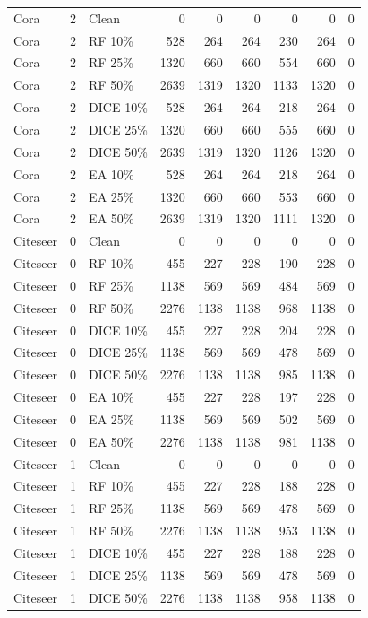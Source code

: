 {\begin{longtable}{lr l rrrrrr}
Cora & 2 & Clean & 0 & 0 & 0 & 0 & 0 & 0 \\
Cora & 2 & RF 10\% & 528 & 264 & 264 & 230 & 264 & 0 \\
Cora & 2 & RF 25\% & 1320 & 660 & 660 & 554 & 660 & 0 \\
Cora & 2 & RF 50\% & 2639 & 1319 & 1320 & 1133 & 1320 & 0 \\
Cora & 2 & DICE 10\% & 528 & 264 & 264 & 218 & 264 & 0 \\
Cora & 2 & DICE 25\% & 1320 & 660 & 660 & 555 & 660 & 0 \\
Cora & 2 & DICE 50\% & 2639 & 1319 & 1320 & 1126 & 1320 & 0 \\
Cora & 2 & EA 10\% & 528 & 264 & 264 & 218 & 264 & 0 \\
Cora & 2 & EA 25\% & 1320 & 660 & 660 & 553 & 660 & 0 \\
Cora & 2 & EA 50\% & 2639 & 1319 & 1320 & 1111 & 1320 & 0 \\
Citeseer & 0 & Clean & 0 & 0 & 0 & 0 & 0 & 0 \\
Citeseer & 0 & RF 10\% & 455 & 227 & 228 & 190 & 228 & 0 \\
Citeseer & 0 & RF 25\% & 1138 & 569 & 569 & 484 & 569 & 0 \\
Citeseer & 0 & RF 50\% & 2276 & 1138 & 1138 & 968 & 1138 & 0 \\
Citeseer & 0 & DICE 10\% & 455 & 227 & 228 & 204 & 228 & 0 \\
Citeseer & 0 & DICE 25\% & 1138 & 569 & 569 & 478 & 569 & 0 \\
Citeseer & 0 & DICE 50\% & 2276 & 1138 & 1138 & 985 & 1138 & 0 \\
Citeseer & 0 & EA 10\% & 455 & 227 & 228 & 197 & 228 & 0 \\
Citeseer & 0 & EA 25\% & 1138 & 569 & 569 & 502 & 569 & 0 \\
Citeseer & 0 & EA 50\% & 2276 & 1138 & 1138 & 981 & 1138 & 0 \\
Citeseer & 1 & Clean & 0 & 0 & 0 & 0 & 0 & 0 \\
Citeseer & 1 & RF 10\% & 455 & 227 & 228 & 188 & 228 & 0 \\
Citeseer & 1 & RF 25\% & 1138 & 569 & 569 & 478 & 569 & 0 \\
Citeseer & 1 & RF 50\% & 2276 & 1138 & 1138 & 953 & 1138 & 0 \\
Citeseer & 1 & DICE 10\% & 455 & 227 & 228 & 188 & 228 & 0 \\
Citeseer & 1 & DICE 25\% & 1138 & 569 & 569 & 478 & 569 & 0 \\
Citeseer & 1 & DICE 50\% & 2276 & 1138 & 1138 & 958 & 1138 & 0 \\

\end{longtable}}
